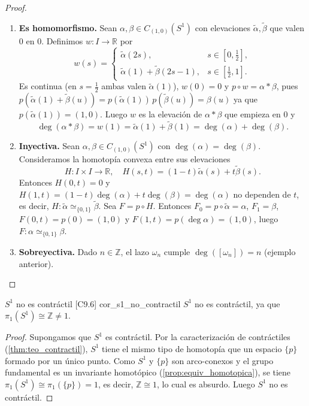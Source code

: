 \begin{proof}
\begin{enumerate}
    \item \textbf{Es homomorfismo.} Sean $\alpha, \beta \in C_{(1,0)}(S^1)$ con elevaciones $\tilde{\alpha}, \tilde{\beta}$ que valen $0$ en $0$. Definimos $w \colon I \to \mathbb{R}$ por
    \[ w(s) = \begin{cases} \tilde{\alpha}(2s), & s \in [0,\tfrac12], \\ \tilde{\alpha}(1) + \tilde{\beta}(2s-1), & s \in [\tfrac12,1]. \end{cases} \]
    Es continua (en $s=\tfrac12$ ambas valen $\tilde{\alpha}(1)$), $w(0)=0$ y $p \circ w = \alpha * \beta$, pues $p(\tilde{\alpha}(1) + \tilde{\beta}(u)) = p(\tilde{\alpha}(1))\,p(\tilde{\beta}(u)) = \beta(u)$ ya que $p(\tilde{\alpha}(1)) = (1,0)$. Luego $w$ es la elevación de $\alpha*\beta$ que empieza en $0$ y
    \[ \deg(\alpha * \beta) = w(1) = \tilde{\alpha}(1) + \tilde{\beta}(1) = \deg(\alpha) + \deg(\beta). \]

    \item \textbf{Inyectiva.} Sean $\alpha, \beta \in C_{(1,0)}(S^1)$ con $\deg(\alpha) = \deg(\beta)$. Consideramos la homotopía convexa entre sus elevaciones
    \[ H \colon I \times I \to \mathbb{R}, \quad H(s,t) = (1-t)\tilde{\alpha}(s) + t\tilde{\beta}(s). \]
    Entonces $H(0,t) = 0$ y $H(1,t) = (1-t)\deg(\alpha) + t\deg(\beta) = \deg(\alpha)$ no dependen de $t$, es decir, $H \colon \tilde{\alpha} \simeq_{\{0,1\}} \tilde{\beta}$. Sea $F = p \circ H$. Entonces $F_0 = p\circ\tilde{\alpha} = \alpha$, $F_1 = \beta$, $F(0,t) = p(0) = (1,0)$ y $F(1,t) = p(\deg\alpha) = (1,0)$, luego $F \colon \alpha \simeq_{\{0,1\}} \beta$.

    \item \textbf{Sobreyectiva.} Dado $n \in \mathbb{Z}$, el lazo $\omega_n$ cumple $\deg([\omega_n]) = n$ (ejemplo anterior).
\end{enumerate}
\end{proof}

\begin{proposicion}{$S^1$ no es contráctil [C9.6] \marcaC}{cor_s1_no_contractil}
$S^1$ no es contráctil, ya que $\pi_1(S^1) \cong \mathbb{Z} \neq 1$.
\end{proposicion}

\begin{proof}
Supongamos que $S^1$ es contráctil. Por la caracterización de contráctiles (\cref{thm:teo_contractil}), $S^1$ tiene el mismo tipo de homotopía que un espacio $\{p\}$ formado por un único punto. Como $S^1$ y $\{p\}$ son arco-conexos y el grupo fundamental es un invariante homotópico (\cref{prop:equiv_homotopica}), se tiene $\pi_1(S^1) \cong \pi_1(\{p\}) = 1$, es decir, $\mathbb{Z} \cong 1$, lo cual es absurdo. Luego $S^1$ no es contráctil.
\end{proof}

